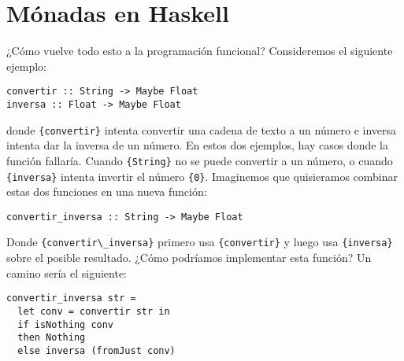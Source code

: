\documentclass[12pt, twoside]{book}
\newcommand{\code}[1]{\Verb+{#1}+}
\begin{document}
\section{Mónadas en Haskell}
¿Cómo vuelve todo esto a la programación funcional?
Consideremos el siguiente ejemplo:
\begin{verbatim}
convertir :: String -> Maybe Float
inversa :: Float -> Maybe Float
\end{verbatim}
donde \code{convertir} intenta convertir una cadena de texto a un número e inversa intenta dar la inversa de un número.
En estos dos ejemplos, hay casos donde la función fallaría.
Cuando \code{String} no se puede convertir a un número, o cuando \code{inversa} intenta invertir el número \code{0}.
Imaginemos que quisieramos combinar estas dos funciones en una nueva función:
\begin{verbatim}
convertir_inversa :: String -> Maybe Float
\end{verbatim}
Donde \code{convertir\_inversa} primero usa \code{convertir} y luego usa \code{inversa} sobre el posible resultado.
¿Cómo podríamos implementar esta función?
Un camino sería el siguiente:
\begin{verbatim}
convertir_inversa str =
  let conv = convertir str in
  if isNothing conv
  then Nothing
  else inversa (fromJust conv)
\end{verbatim}
\end{document}

